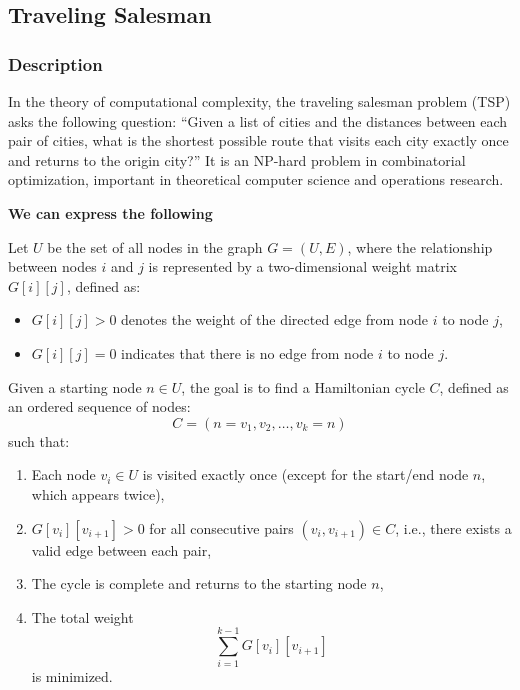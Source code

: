 \subsection{Traveling Salesman}
\subsubsection{Description}

In the theory of computational complexity, the traveling salesman problem (TSP) asks the following question: ``Given a list of cities and the distances between each pair of cities, what is the shortest possible route that visits each city exactly once and returns to the origin city?'' It is an NP-hard problem in combinatorial optimization, important in theoretical computer science and operations research.

\textbf{We can express the following}

Let \( U \) be the set of all nodes in the graph \( G = (U, E) \), where the relationship between nodes \( i \) and \( j \) is represented by a two-dimensional weight matrix \( G[i][j] \), defined as:

\begin{itemize}
    \item \( G[i][j] > 0 \) denotes the weight of the directed edge from node \( i \) to node \( j \),
    \item \( G[i][j] = 0 \) indicates that there is no edge from node \( i \) to node \( j \).
\end{itemize}

Given a starting node \( n \in U \), the goal is to find a Hamiltonian cycle \( C \), defined as an ordered sequence of nodes:
\[
C = (n = v_1, v_2, \ldots, v_k = n)
\]
such that:

\begin{enumerate}[label=(\alph*)]
    \item Each node \( v_i \in U \) is visited exactly once (except for the start/end node \( n \), which appears twice),
    \item \( G[v_i][v_{i+1}] > 0 \) for all consecutive pairs \( (v_i, v_{i+1}) \in C \), i.e., there exists a valid edge between each pair,
    \item The cycle is complete and returns to the starting node \( n \),
    \item The total weight
    \[
    \sum_{i=1}^{k-1} G[v_i][v_{i+1}]
    \]
    is minimized.
\end{enumerate}

